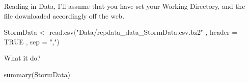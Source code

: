 \documentclass[
]{article}
\newenvironment{Shaded}{\begin{snugshade}}{\end{snugshade}}
\newcommand{\AttributeTok}[1]{\textcolor[rgb]{0.77,0.63,0.00}{#1}}
\newcommand{\ConstantTok}[1]{\textcolor[rgb]{0.00,0.00,0.00}{#1}}
\newcommand{\FunctionTok}[1]{\textcolor[rgb]{0.00,0.00,0.00}{#1}}
\newcommand{\NormalTok}[1]{#1}
\newcommand{\OtherTok}[1]{\textcolor[rgb]{0.56,0.35,0.01}{#1}}
\newcommand{\StringTok}[1]{\textcolor[rgb]{0.31,0.60,0.02}{#1}}
\begin{document}
Reading in Data, I'll assume that you have set your Working Directory,
and the file downloaded accordingly off the web.

\begin{Shaded}
\begin{Highlighting}[]
\NormalTok{StormData }\OtherTok{\textless{}{-}} \FunctionTok{read.csv}\NormalTok{(}\StringTok{"Data/repdata\_data\_StormData.csv.bz2"}
\NormalTok{                      , }\AttributeTok{header =} \ConstantTok{TRUE}
\NormalTok{                      , }\AttributeTok{sep =} \StringTok{","}\NormalTok{)}
\end{Highlighting}
\end{Shaded}

What it do?

\begin{Shaded}
\begin{Highlighting}[]
\FunctionTok{summary}\NormalTok{(StormData)}
\end{Highlighting}
\end{Shaded}
\end{document}
